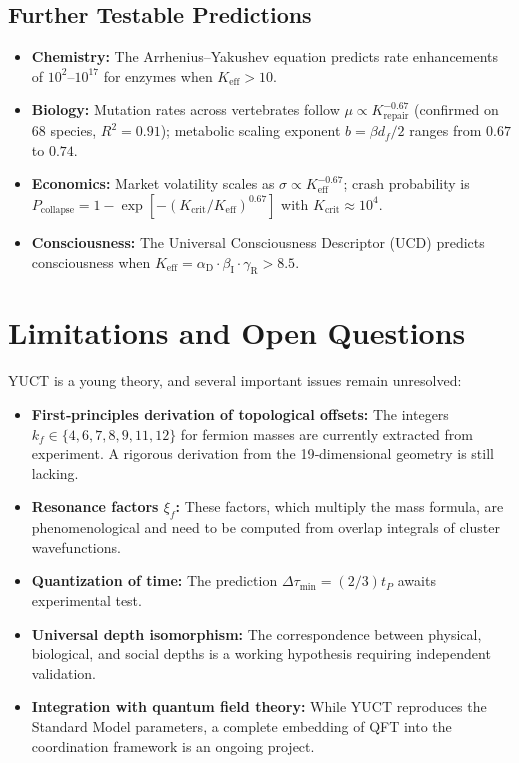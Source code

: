 \documentclass[11pt]{article}
\theoremstyle{remark}
\newcommand{\Keff}{K_{\mathrm{eff}}}
\newcommand{\alD}{\alpha_{\mathrm{D}}}
\newcommand{\beI}{\beta_{\mathrm{I}}}
\newcommand{\gaR}{\gamma_{\mathrm{R}}}
\begin{document}
	\subsection{Further Testable Predictions}
	
	\begin{itemize}
		\item \textbf{Chemistry:} The Arrhenius–Yakushev equation predicts rate enhancements of \(10^2\)–\(10^{17}\) for enzymes when \(\Keff > 10\).
		\item \textbf{Biology:} Mutation rates across vertebrates follow \(\mu \propto K_{\text{repair}}^{-0.67}\) (confirmed on 68 species, \(R^2=0.91\)); metabolic scaling exponent \(b = \beta d_f/2\) ranges from \(0.67\) to \(0.74\).
		\item \textbf{Economics:} Market volatility scales as \(\sigma \propto \Keff^{-0.67}\); crash probability is \(P_{\text{collapse}} = 1 - \exp[-(K_{\text{crit}}/\Keff)^{0.67}]\) with \(K_{\text{crit}} \approx 10^4\).
		\item \textbf{Consciousness:} The Universal Consciousness Descriptor (UCD) predicts consciousness when \(\Keff = \alD \cdot \beI \cdot \gaR > 8.5\).
	\end{itemize}
	
	\section{Limitations and Open Questions}
	\label{sec:limitations}
	
	YUCT is a young theory, and several important issues remain unresolved:
	\begin{itemize}
		\item \textbf{First‑principles derivation of topological offsets:} The integers \(k_f \in \{4,6,7,8,9,11,12\}\) for fermion masses are currently extracted from experiment. A rigorous derivation from the 19‑dimensional geometry is still lacking.
		\item \textbf{Resonance factors \(\xi_f\):} These factors, which multiply the mass formula, are phenomenological and need to be computed from overlap integrals of cluster wavefunctions.
		\item \textbf{Quantization of time:} The prediction \(\Delta\tau_{\min} = (2/3) t_P\) awaits experimental test.
		\item \textbf{Universal depth isomorphism:} The correspondence between physical, biological, and social depths is a working hypothesis requiring independent validation.
		\item \textbf{Integration with quantum field theory:} While YUCT reproduces the Standard Model parameters, a complete embedding of QFT into the coordination framework is an ongoing project.
	\end{itemize}
	
\end{document}
